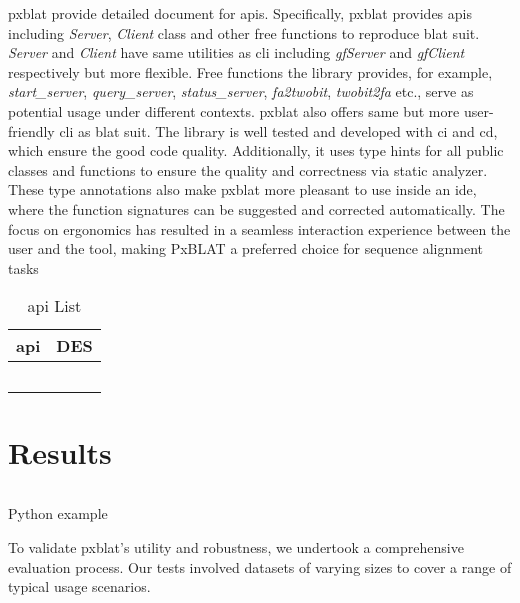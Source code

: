 \gls{pxblat} provide detailed document for \glspl{api}.
Specifically, \gls{pxblat} provides \glspl{api} including  \emph{Server}, \emph{Client} class and other free functions to reproduce \gls{blat} suit.
\emph{Server} and \emph{Client} have same utilities as \gls{cli} including \emph{gfServer} and \emph{gfClient} respectively but more flexible.
Free functions the library provides, for example, \emph{start\_server}, \emph{query\_server}, \emph{status\_server}, \emph{fa2twobit}, \emph{twobit2fa} etc., serve as potential usage under different contexts.
\gls{pxblat} also offers same but more user-friendly \gls{cli} as \gls{blat} suit.
The library is well tested and developed with \gls{ci} and \gls{cd}, which ensure the good code quality.
Additionally, it uses type hints for all public classes and functions to ensure the quality and correctness via static analyzer.
These type annotations also make \gls{pxblat} more pleasant to use inside an \gls{ide}, where the function signatures can be suggested and corrected automatically.
The focus on ergonomics has resulted in a seamless interaction experience between the user and the tool, making PxBLAT a preferred choice for sequence alignment tasks


\begin{table}[]
	\caption{\gls{api} List}
	\label{tab:api}
	\centering
	\begin{tabular}{@{}ll@{}}
		\toprule
		\gls{api} & DES \\ \midrule
		          &     \\
		          &     \\
		          &     \\
		          &     \\
		          &     \\ \bottomrule
	\end{tabular}
\end{table}



\section*{Results}\label{sec:results}

\begin{listing}
	\inputminted[linenos]{python}{codes/example1.py}
	\caption{Python example}
	\label{listing:1}
\end{listing}


To validate \gls{pxblat}'s utility and robustness, we undertook a comprehensive evaluation process.
Our tests involved datasets of varying sizes to cover a range of typical usage scenarios.

